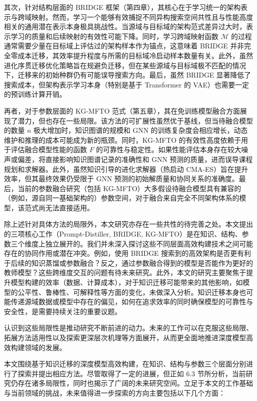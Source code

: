 \documentclass[../main.tex]{subfiles}
\begin{document}
其次，针对结构层面的 BRIDGE 框架（第四章），其核心在于学习统一的架构表示与跨域映射。然而，学习一个能够有效捕捉不同异构搜索空间共性且与性能高度相关的通用潜在表示本身极具挑战性。当源域与目标域的架构范式差异过大时，表示学习的质量和后续映射的有效性可能下降。同时，学习跨域映射函数 $\mathcal{M}$ 的过程通常需要少量在目标域上评估过的架构样本作为锚点，这意味着 BRIDGE 并非完全零成本迁移，其效率提升程度与所需的目标域冷启动样本数量有关。此外，虽然进化序贯迁移优化策略旨在规避负迁移，但在某些源域与目标域极不匹配的情况下，迁移来的初始种群仍有可能误导搜索方向。最后，虽然 BRIDGE 显著降低了搜索成本，但架构表示学习本身（特别是基于 Transformer 的 VAE）也需要一定的预训练计算开销。

再者，对于参数层面的 KG-MFTO 范式（第五章），其在免训练模型融合方面展现了潜力，但也存在一些局限。该方法的可扩展性虽然优于基线，但当待融合模型的数量 $n$ 极大增加时，知识图谱的规模和 GNN 的训练复杂度会相应增长，动态维护和推理的成本可能成为新的瓶颈。同时，KG-MFTO 的有效性高度依赖于用于评估融合模型性能的函数 $F$ 的可靠性与稳定性。如果性能评估本身存在较大噪声或偏差，将直接影响知识图谱记录的准确性和 GNN 预测的质量，进而误导课程规划和求解器。此外，虽然知识引导的进化求解器（热启动 CMA-ES）旨在提升效率，但其最终效果仍受限于 GNN 预测的初始解质量和协同关系的准确度。最后，当前的参数融合研究（包括 KG-MFTO）大多假设待融合模型具有兼容的（例如，源自同一基础架构的）参数空间，对于融合来自完全不同架构体系的模型，该范式尚无法直接适用。

除上述针对具体方法的局限外，本文研究亦存在一些共性的待完善之处。本文提出的三项核心工作（Prompt-Distiller, BRIDGE, KG-MFTO）是在知识、结构、参数三个维度上独立展开的。我们并未深入探讨这些不同层面高效构建技术之间可能存在的协同作用或潜在冲突。例如，使用 BRIDGE 搜索到的高效架构是否更有利于后续的知识蒸馏或参数融合？反之，通过参数融合得到的模型是否能作为更好的教师模型？这些跨维度交互的问题有待未来研究。此外，本文的研究主要聚焦于提升模型构建的效率（数据、计算成本），对于知识迁移可能带来的其他影响，如模型的公平性、鲁棒性、可解释性等方面的变化，未做深入分析。知识迁移本身也可能传递源域数据或模型中存在的偏见，如何在追求效率的同时确保模型的可靠性与安全性，是需要持续关注的重要议题。

认识到这些局限性是推动研究不断前进的动力。未来的工作可以在克服这些局限、拓展方法适用性以及探索更深层次机理等方面展开，从而更全面地推进深度模型高效构建领域的发展。

\label{sec:ch6-3-future-work}

本文围绕基于知识迁移的深度模型高效构建，在知识、结构与参数三个层面分别进行了探索并提出相应方法。尽管取得了一定的进展，但正如 6.3 节所分析，当前研究仍存在诸多局限性，同时也揭示了广阔的未来研究空间。立足于本文的工作基础与当前领域的挑战，未来值得进一步探索的方向主要包括以下几个方面：
\end{document}
